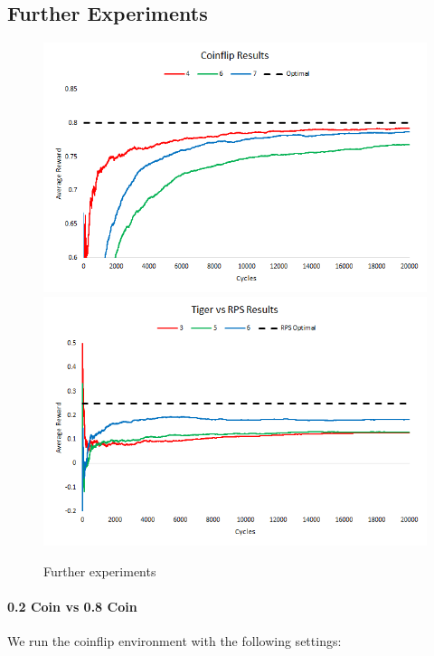 \documentclass[paper=a4, fontsize=11pt]{scrartcl} %
\numberwithin{equation}{section} %
\numberwithin{figure}{section} %
\numberwithin{table}{section} %
\begin{document}
\subsection{Further Experiments}

\begin{figure}
\includegraphics[width=\textwidth]{plots/coinflip_tests1}
\includegraphics[width=\textwidth]{plots/rps_tiger_1}
\caption{\label{plot:cointests}Further experiments}
\end{figure}

\paragraph{0.2 Coin vs 0.8 Coin}
We run the coinflip environment with the following settings:

\bigskip
\end{document}
